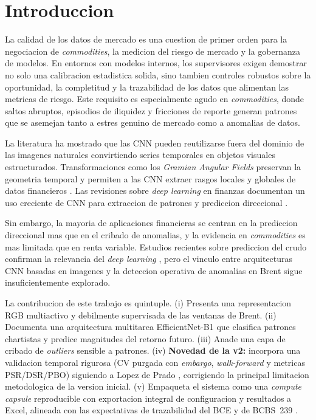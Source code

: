 \documentclass[preprint,12pt,3p]{elsarticle}
\begin{document}
\section{Introduccion}
La calidad de los datos de mercado es una cuestion de primer orden para la
negociacion de \emph{commodities}, la medicion del riesgo de mercado y la
gobernanza de modelos. En entornos con modelos internos, los supervisores exigen
demostrar no solo una calibracion estadistica solida, sino tambien controles
robustos sobre la oportunidad, la completitud y la trazabilidad de los datos que
alimentan las metricas de riesgo. Este requisito es especialmente agudo en
\emph{commodities}, donde saltos abruptos, episodios de iliquidez y fricciones de
reporte generan patrones que se asemejan tanto a estres genuino de mercado como a
anomalias de datos.

La literatura ha mostrado que las CNN pueden reutilizarse fuera del dominio de
las imagenes naturales convirtiendo series temporales en objetos visuales
estructurados. Transformaciones como los \emph{Gramian Angular Fields} preservan
la geometria temporal y permiten a las CNN extraer rasgos locales y globales de
datos financieros \cite{wang2015imaging}. Las revisiones sobre \emph{deep
learning} en finanzas documentan un uso creciente de CNN para extraccion de
patrones y prediccion direccional \cite{sezer2020financial,hoseinzade2019cnnpred,
tsantekidis2020using,bao2025datadriven,giantsidi2025deep}.

Sin embargo, la mayoria de aplicaciones financieras se centran en la prediccion
direccional mas que en el cribado de anomalias, y la evidencia en
\emph{commodities} es mas limitada que en renta variable. Estudios recientes
sobre prediccion del crudo confirman la relevancia del \emph{deep learning}
\cite{shen2024intelligent,aldabagh2023hybrid,jin2024price,foroutan2024deep}, pero
el vinculo entre arquitecturas CNN basadas en imagenes y la deteccion operativa
de anomalias en Brent sigue insuficientemente explorado.

La contribucion de este trabajo es quintuple. (i) Presenta una representacion RGB
multiactivo y debilmente supervisada de las ventanas de Brent. (ii) Documenta una
arquitectura multitarea EfficientNet-B1 \cite{tan2019efficientnet} que clasifica
patrones chartistas y predice magnitudes del retorno futuro. (iii) Anade una capa
de cribado de \emph{outliers} sensible a patrones. (iv) \textbf{Novedad de la v2:}
incorpora una validacion temporal rigurosa (CV purgada con \emph{embargo},
\emph{walk-forward} y metricas PSR/DSR/PBO) siguiendo a Lopez de Prado
\cite{lopezdeprado2018advances,bailey2012sharpe,bailey2014deflated,
bailey2017probability}, corrigiendo la principal limitacion metodologica de la
version inicial. (v) Empaqueta el sistema como una \emph{compute capsule}
reproducible con exportacion integral de configuracion y resultados a Excel,
alineada con las expectativas de trazabilidad del BCE y de BCBS~239
\cite{ecb2025guide,bcbs239}.
\end{document}
